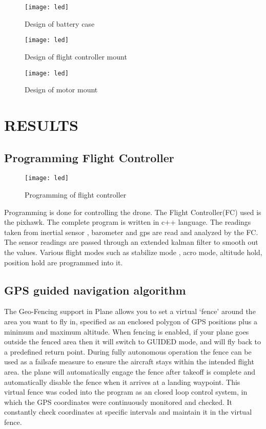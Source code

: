 \documentclass[12pt,a4paper]{report}
\begin{document}
\begin{figure}[h!]
\centering
\texttt{[image: led]}
\caption{Design of battery case}
\label{circuit}
\end{figure}

\begin{figure}[h!]
\centering
\texttt{[image: led]}
\caption{Design of flight controller mount}
\label{circuit}
\end{figure}

\begin{figure}[h!]
\centering
\texttt{[image: led]}
\caption{Design of motor mount}
\label{circuit}
\end{figure}
\chapter{{RESULTS}}





\section{Programming Flight Controller}


\begin{figure}[h!]
\centering
\texttt{[image: led]}
\caption{Programming of flight controller}
\label{circuit}
\end{figure}
\newpage
\hspace*{1cm} Programming is done for controlling the drone. The Flight Controller(FC) used is the pixhawk. The complete program is written in c++ language.  The readings taken from inertial sensor , barometer and gps are read and analyzed by the FC. The sensor readings are passed through an extended kalman filter to smooth out the values. Various flight modes such as stabilize mode , acro mode, altitude hold, position hold are programmed into it.

\section{GPS guided navigation algorithm}

\hspace*{1cm} The Geo-Fencing support in Plane allows you to set a virtual ‘fence’ around the area you want to fly in, specified as an enclosed polygon of GPS positions plus a minimum and maximum altitude.
 When fencing is enabled, if your plane goes outside the fenced area then it will switch to GUIDED mode, and will fly back to a predefined return point.
During fully autonomous operation the fence can be used as a failsafe measure to ensure the aircraft stays within the intended flight area.
 the plane will automatically engage the fence after takeoff is complete and automatically disable the fence when it arrives at a landing waypoint.
 This virtual fence was coded into the program as an closed loop control system, in which the GPS coordinates were continuously monitored and checked.
 It constantly check coordinates at specific intervals and maintain it in the virtual fence.
\end{document}
